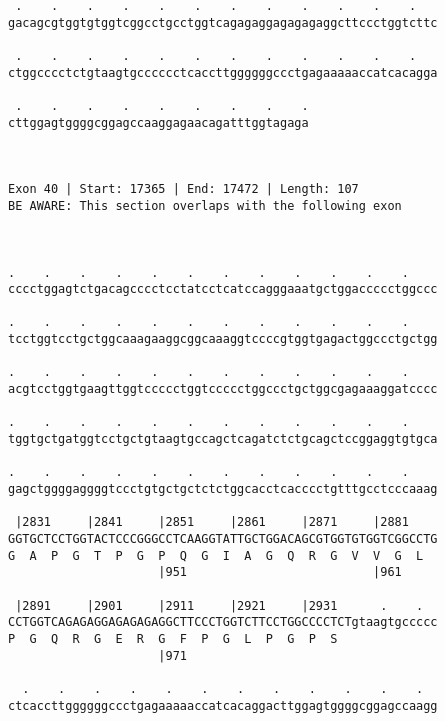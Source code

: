 \documentclass{article}
\begin{document}
\begin{Verbatim}
 .    .    .    .    .    .    .    .    .    .    .    .   
gacagcgtggtgtggtcggcctgcctggtcagagaggagagagaggcttccctggtcttc
                                                            
 .    .    .    .    .    .    .    .    .    .    .    .   
ctggcccctctgtaagtgcccccctcaccttggggggccctgagaaaaaccatcacagga
                                                            
 .    .    .    .    .    .    .    .    .
cttggagtggggcggagccaaggagaacagatttggtagaga
                                          
                                          
 
Exon 40 | Start: 17365 | End: 17472 | Length: 107
BE AWARE: This section overlaps with the following exon



.    .    .    .    .    .    .    .    .    .    .    .    
cccctggagtctgacagcccctcctatcctcatccagggaaatgctggaccccctggccc
                                                            
.    .    .    .    .    .    .    .    .    .    .    .    
tcctggtcctgctggcaaagaaggcggcaaaggtccccgtggtgagactggccctgctgg
                                                            
.    .    .    .    .    .    .    .    .    .    .    .    
acgtcctggtgaagttggtccccctggtccccctggccctgctggcgagaaaggatcccc
                                                            
.    .    .    .    .    .    .    .    .    .    .    .    
tggtgctgatggtcctgctgtaagtgccagctcagatctctgcagctccggaggtgtgca
                                                            
.    .    .    .    .    .    .    .    .    .    .    .    
gagctggggaggggtccctgtgctgctctctggcacctcacccctgtttgcctcccaaag
                                                            
 |2831     |2841     |2851     |2861     |2871     |2881    
GGTGCTCCTGGTACTCCCGGGCCTCAAGGTATTGCTGGACAGCGTGGTGTGGTCGGCCTG
G  A  P  G  T  P  G  P  Q  G  I  A  G  Q  R  G  V  V  G  L  
                     |951                          |961     
  
 |2891     |2901     |2911     |2921     |2931      .    .  
CCTGGTCAGAGAGGAGAGAGAGGCTTCCCTGGTCTTCCTGGCCCCTCTgtaagtgccccc
P  G  Q  R  G  E  R  G  F  P  G  L  P  G  P  S              
                     |971                                   
  
  .    .    .    .    .    .    .    .    .    .    .    .  
ctcaccttggggggccctgagaaaaaccatcacaggacttggagtggggcggagccaagg
                                                            

\end{Verbatim}
\end{document}
